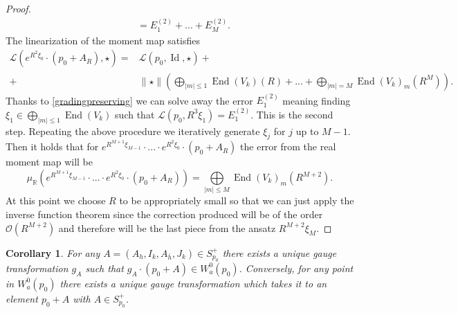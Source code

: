 \documentclass[12pt,oneside,reqno]{amsart}
\newtheorem{corollary}[theorem]{Corollary}
\theoremstyle{definition}
\numberwithin{equation}{section}
\numberwithin{theorem}{section}
\newcommand{\R}{\mathbb{R}}
\newcommand{\End}{\operatorname{End}}
\newcommand{\Id}{\operatorname{Id}}
\begin{document}
\begin{proof}
\begin{equation}
\begin{split}
&= E_1^{(2)}+...+ E_M^{(2)}.
\end{split}
\end{equation}
%
The linearization of the moment map satisfies 
%
\begin{equation}
\begin{split}
\mathcal L(e^{R^2\xi_0}\cdot(p_0+A_R),\star) = &\mathcal L(p_0,\Id,\star ) +\\
+&\|\star\|\left(\bigoplus\limits_{|m|\le 1}\End(V_k)(R)+ ... + \bigoplus\limits_{|m|= M} \End(V_k)_m(R^{M})\right).
\end{split}
\end{equation}
%
Thanks to \eqref{gradingpreserving} we can solve away the error $E_1^{(2)}$ meaning finding $\xi_1\in  \bigoplus\limits_{|m|\le1}\End(V_k)$ such that $\mathcal L(p_0,R^3\xi_1) = E_1^{(2)}$. This is the second step. Repeating the above procedure we iteratively generate $\xi_j$ for $j$ up to $M-1$. Then it holds that for 
$e^{R^{M+1}\xi_{M-1}}\cdot ... \cdot e^{R^2\xi_0}\cdot (p_0+A_R)$ the error from the real moment map will be
%
\begin{equation}\label{finalerror}
\mu_{\R}(e^{R^{M+1}\xi_{M-1}}\cdot...\cdot e^{R^2\xi_0}\cdot (p_0+A_R)) = \bigoplus\limits_{|m|\le M}\End(V_k)_m(R^{M+2}).
\end{equation}
%
At this point we choose $R$ to be appropriately small so that we can just apply the inverse function theorem since the correction produced will be of the order $ \mathcal O(R^{M+2})$ and therefore will be the last piece from the ansatz $R^{M+2}\xi_M$.
\end{proof}
%

%
\begin{corollary}\label{GG}
For any $A= (A_h, I_k,A_{\bar h}, J_k)\in S^+_{p_0}$ there exists a unique gauge transformation $g_A$ such that $g_A\cdot(p_0+A) \in W_a^0(p_0)$. Conversely, for any point in $W_a^0(p_0)$ there exists a unique gauge transformation which takes it to an element $p_0+A$ with $A\in S^+_{p_0}$. 
\end{corollary}
%
\end{document}
